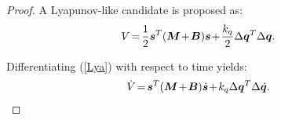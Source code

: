 \documentclass[letterpaper, 10 pt, conference]{ieeeconf}
\begin{document}
\begin{proof}
A Lyapunov-like candidate is proposed as:
\begin{eqnarray}
&V\hspace{-0.05cm}=\hspace{-0.05cm}\frac{1}{2}\bm s^T(\bm M\hspace{-0.05cm}+\hspace{-0.05cm}\bm B)\bm
s\hspace{-0.05cm}+\hspace{-0.05cm}\frac{k_q}{2}\Delta\bm q^T\Delta\bm q.\label{Lya}
\end{eqnarray}

Differentiating (\ref{Lya}) with respect to time yields:
\begin{eqnarray}
&\dot V\hspace{-0.05cm}=\hspace{-0.05cm}\bm s^T(\bm M\hspace{-0.05cm}+\hspace{-0.05cm}\bm B)\dot{\bm
s}\hspace{-0.05cm}+\hspace{-0.05cm}k_q\Delta\bm q^T\Delta\dot{\bm q}.\label{dLya}
\end{eqnarray}


\end{proof}
\end{document}
